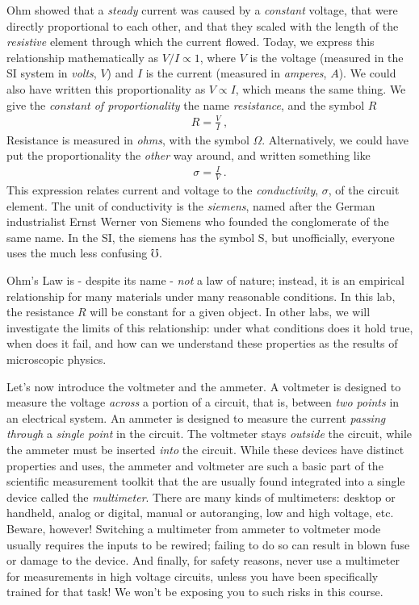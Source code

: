 \documentclass[12pt]{article}
\begin{document}
Ohm showed that a \textit{steady} current was caused by a
\textit{constant} voltage, that were directly proportional to each
other, and that they scaled with the length of the \textit{resistive}
element through which the current flowed.  Today, we express this
relationship mathematically as $V/I \propto 1$, where $V$ is the
voltage (measured in the SI system in \textit{volts}, $V$) and $I$ is
the current (measured in \textit{amperes}, $A$).  We could also have
written this proportionality as $V \propto I$, which means the same
thing.  We give the \textit{constant of proportionality} the name
\textit{resistance}, and the symbol $R$
\begin{gather*}
  R = \frac{V}{I} \ ,
\end{gather*}
Resistance is measured in \textit{ohms}, with the symbol $\Omega$.
Alternatively, we could have put the proportionality the
\textit{other} way around, and written something like
\begin{gather*}
  \sigma = \frac{I}{V}\ .
\end{gather*}
This expression relates current and voltage to the
\textit{conductivity}, $\sigma$, of the circuit element.  The unit of
conductivity is the \textit{siemens}, named after the German
industrialist Ernst Werner von Siemens who founded the conglomerate of
the same name.  In the SI, the siemens has the symbol \unit{S}, but
unofficially, everyone uses the much less confusing $\mho$.

Ohm's Law is - despite its name - \textit{not} a law of nature;
instead, it is an empirical relationship for many materials under many
reasonable conditions.  In this lab, the resistance $R$ will be
constant for a given object.  In other labs, we will investigate the
limits of this relationship: under what conditions does it hold true,
when does it fail, and how can we understand these properties as the
results of microscopic physics.

Let's now introduce the voltmeter and the ammeter.  A voltmeter is
designed to measure the voltage \textit{across} a portion of a
circuit, that is, between \textit{two points} in an electrical system.
An ammeter is designed to measure the current \textit{passing through}
a \textit{single point} in the circuit.  The voltmeter stays
\textit{outside} the circuit, while the ammeter must be inserted
\textit{into} the circuit.  While these devices have distinct
properties and uses, the ammeter and voltmeter are such a basic part
of the scientific measurement toolkit that the are usually found
integrated into a single device called the \textit{multimeter}.  There
are many kinds of multimeters: desktop or handheld, analog or digital,
manual or autoranging, low and high voltage, etc.  Beware, however!
Switching a multimeter from ammeter to voltmeter mode usually requires
the inputs to be rewired; failing to do so can result in blown fuse or
damage to the device.  And finally, for safety reasons, never use a
multimeter for measurements in high voltage circuits, unless you have
been specifically trained for that task!  We won't be exposing you to
such risks in this course.
\end{document}
